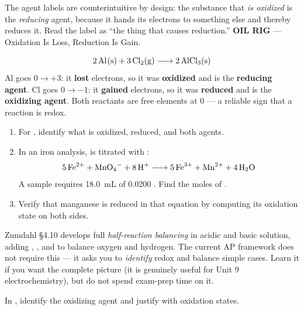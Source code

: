 \documentclass{apchem-notes}
\begin{document}
\begin{apctrap}
The agent labels are counterintuitive by design: the substance that
\emph{is oxidized} is the \emph{reducing} agent, because it hands its
electrons to something else and thereby reduces it. Read the label as
``the thing that causes reduction.'' \textbf{OIL RIG} --- Oxidation Is Loss,
Reduction Is Gain.
\end{apctrap}

\begin{workedexample}
\[ \ce{2 Al(s) + 3 Cl2(g) -> 2 AlCl3(s)} \]
Al goes $0 \to +3$: it \textbf{lost} electrons, so it was \textbf{oxidized}
and is the \textbf{reducing agent}.
Cl goes $0 \to -1$: it \textbf{gained} electrons, so it was
\textbf{reduced} and is the \textbf{oxidizing agent}.
Both reactants are free elements at $0$ --- a reliable sign that a reaction
is redox.
\end{workedexample}


\begin{enumerate}[leftmargin=*,itemsep=0.4em]
  \item For , identify what is
        oxidized, reduced, and both agents. 
  \item In an iron analysis,  is titrated with :
        \[ \ce{5 Fe^2+ + MnO4^- + 8 H+ -> 5 Fe^3+ + Mn^2+ + 4 H2O} \]
        A sample requires \SI{18.0}{\milli\liter} of \SI{0.0200}{\Molar}
        . Find the moles of . \workspace[2.4cm]
  \item Verify that manganese is reduced in that equation by computing its
        oxidation state on both sides.
\end{enumerate}

\begin{apcnote}
Zumdahl \S4.10 develops full \emph{half-reaction balancing} in acidic and
basic solution, adding , , and  to balance oxygen and
hydrogen. The current AP framework does not require this --- it asks you to
\emph{identify} redox and balance simple cases. Learn it if you want the
complete picture (it is genuinely useful for Unit 9 electrochemistry), but
do not spend exam-prep time on it.
\end{apcnote}

\begin{exitticket}
In , identify the oxidizing agent and justify with
oxidation states. 
\end{exitticket}
\end{document}
